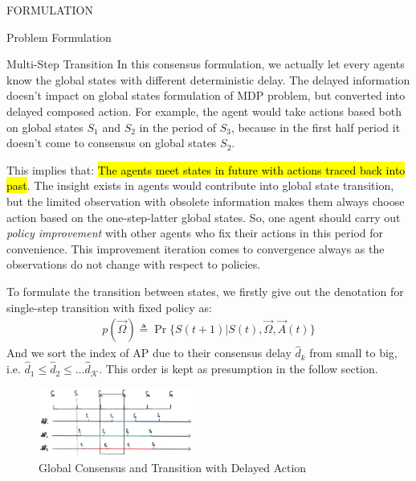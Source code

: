 \documentclass[10pt, conference, letterpaper]{IEEEtran}
\begin{document}
\begin{section}{FORMULATION}
\begin{subsection}{Problem Formulation}
\begin{subsubsection}{Multi-Step Transition}
                In this consensus formulation, we actually let every agents know the global states with different deterministic delay. The delayed information doesn't impact on global states formulation of MDP problem, but converted into delayed composed action. For example, the agent would take actions based both on global states $S_1$ and $S_2$ in the period of $S_3$, because in the first half period it doesn't come to consensus on global states $S_2$.

                This implies that: \hl{The agents meet states in future with actions traced back into past}. The insight exists in agents would contribute into global state transition, but the limited observation with obsolete information makes them always choose action based on the one-step-latter global states. So, one agent should carry out \emph{policy improvement} with other agents who fix their actions in this period for convenience. This improvement iteration comes to convergence always as the observations do not change with respect to policies.

                To formulate the transition between states, we firstly give out the denotation for single-step transition with fixed policy as:
                \begin{align}
                    p(\vec{\Omega}) \triangleq \Pr\{ S(t+1)|S(t), \vec{\Omega},\vec{A}(t) \}
                \end{align}
                And we sort the index of AP due to their consensus delay $\hat{d}_k$ from small to big, i.e. $\hat{d}_1 \leq \hat{d}_2 \leq \dots \hat{d}_{\mathcal{K}}$. This order is kept as presumption in the follow section.
                
                \begin{figure}[h]
                    \centering
                    \includegraphics[width=0.45\textwidth]{broadcast-trans.png}
                    \caption{Global Consensus and Transition with Delayed Action}
                    \label{fig:br-trans}
                \end{figure}


\end{subsubsection}
\end{subsection}
\end{section}
\end{document}
